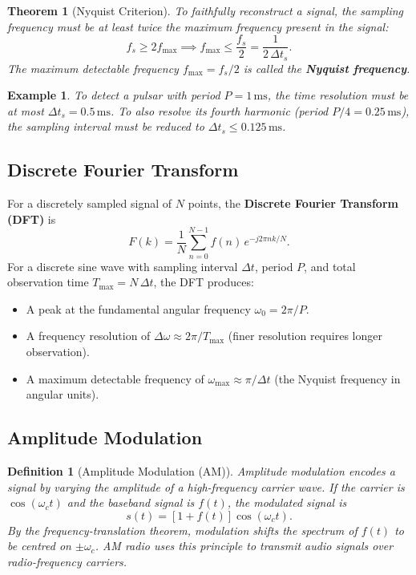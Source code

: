 \documentclass{article}
\newtheorem{theorem}{Theorem}
\newtheorem{definition}{Definition}
\newtheorem*{example}{Example}
\begin{document}
\begin{theorem}[Nyquist Criterion]
    To faithfully reconstruct a signal, the sampling frequency must be at least twice the maximum frequency present in the signal:
    \[f_s \geq 2f_{\max} \implies f_{\max} \leq \frac{f_s}{2} = \frac{1}{2\,\Delta t_s}.\]
    The maximum detectable frequency $f_{\max} = f_s/2$ is called the \textbf{Nyquist frequency}.
\end{theorem}

\begin{example}
    To detect a pulsar with period $P = 1\,\text{ms}$, the time resolution must be at most $\Delta t_s = 0.5\,\text{ms}$. To also resolve its fourth harmonic (period $P/4 = 0.25\,\text{ms}$), the sampling interval must be reduced to $\Delta t_s \leq 0.125\,\text{ms}$.
\end{example}

\subsection{Discrete Fourier Transform}

For a discretely sampled signal of $N$ points, the \textbf{Discrete Fourier Transform (DFT)} is
\[F(k) = \frac{1}{N}\sum_{n=0}^{N-1} f(n)\,e^{-j2\pi nk/N}.\]
For a discrete sine wave with sampling interval $\Delta t$, period $P$, and total observation time $T_{\max} = N\,\Delta t$, the DFT produces:
\begin{itemize}
    \item A peak at the fundamental angular frequency $\omega_0 = 2\pi/P$.
    \item A frequency resolution of $\Delta\omega \approx 2\pi/T_{\max}$ (finer resolution requires longer observation).
    \item A maximum detectable frequency of $\omega_{\max} \approx \pi/\Delta t$ (the Nyquist frequency in angular units).
\end{itemize}

\subsection{Amplitude Modulation}

\begin{definition}[Amplitude Modulation (AM)]
    Amplitude modulation encodes a signal by varying the amplitude of a high-frequency carrier wave. If the carrier is $\cos(\omega_c t)$ and the baseband signal is $f(t)$, the modulated signal is
    \[s(t) = \left[1 + f(t)\right]\cos(\omega_c t).\]
    By the frequency-translation theorem, modulation shifts the spectrum of $f(t)$ to be centred on $\pm\omega_c$. AM radio uses this principle to transmit audio signals over radio-frequency carriers.
\end{definition}
\end{document}
